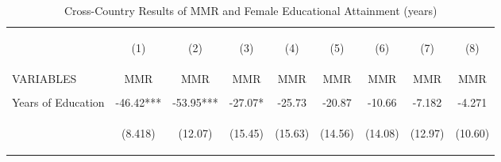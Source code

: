 \begin{landscape}\begin{subtables}\begin{table}[htpb!]\begin{center}\caption{Cross-Country Results of MMR and Female Educational Attainment (years)}\label{MMRtab:MMRyrs}\begin{tabular}{lcccccccc}\toprule&\begin{footnotesize}(1)\end{footnotesize}&\begin{footnotesize}(2)\end{footnotesize}&\begin{footnotesize}(3)\end{footnotesize}&\begin{footnotesize}(4)\end{footnotesize}&\begin{footnotesize}(5)\end{footnotesize}&\begin{footnotesize}(6)\end{footnotesize}&\begin{footnotesize}(7)\end{footnotesize}&\begin{footnotesize}(8) \end{footnotesize}\\
VARIABLES&MMR&MMR&MMR&MMR&MMR&MMR&MMR&MMR\\ \midrule
&&&&&&&&\\
Years of Education&-46.42***&-53.95***&-27.07*&-25.73&-20.87&-10.66&-7.182&-4.271\\
&\begin{footnotesize}(8.418)\end{footnotesize}&\begin{footnotesize}(12.07)\end{footnotesize}&\begin{footnotesize}(15.45)\end{footnotesize}&\begin{footnotesize}(15.63)\end{footnotesize}&\begin{footnotesize}(14.56)\end{footnotesize}&\begin{footnotesize}(14.08)\end{footnotesize}&\begin{footnotesize}(12.97)\end{footnotesize}&\begin{footnotesize}(10.60)\end{footnotesize}\\

\end{tabular}
\end{center}
\end{table}
\end{subtables}
\end{landscape}
